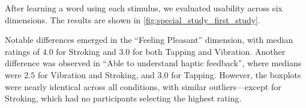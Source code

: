 



After learning a word using each stimulus, we evaluated usability across six dimensions. The results are shown in \autoref{fig:special_study_first_study}.

Notable differences emerged in the \enquote{Feeling Pleasant} dimension, with median ratings of $4.0$ for Stroking and $3.0$ for both Tapping and Vibration. Another difference was observed in \enquote{Able to understand haptic feedback}, where medians were $2.5$ for Vibration and Stroking, and $3.0$ for Tapping. However, the boxplots were nearly identical across all conditions, with similar outliers—except for Stroking, which had no participants selecting the highest rating.

